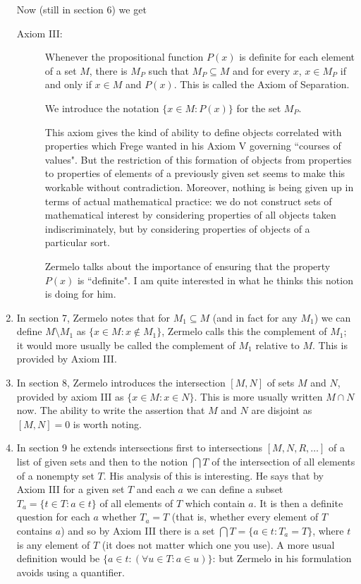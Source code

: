 \documentclass[12pt]{article}
\begin{document}
\begin{enumerate}
Now (still in section 6) we get

\begin{description}

\item[Axiom III:]  Whenever the propositional function $P(x)$ is definite for each element of a set $M$, there is $M_P$ such that $M_P \subseteq M$ and for every $x$,
$x \in M_P$ if and only if $x \in M$ and $P(x)$.  This is called the Axiom of Separation.

We introduce the notation $\{x \in M:P(x)\}$ for the set $M_P$.

This axiom gives the kind of ability to define objects correlated with properties which Frege wanted in his Axiom V governing ``courses of values".  But the restriction of
this formation of objects from properties to properties of elements of a previously given set seems to make this workable without contradiction.  Moreover, nothing is being given up
in terms of actual mathematical practice:  we do not construct sets of mathematical interest by considering properties of all objects taken indiscriminately, but by considering properties of objects of a particular sort.

Zermelo talks about the importance of ensuring that the property $P(x)$ is ``definite".  I am quite interested in what he thinks this notion is doing for him.

\end{description}

\item  In section 7, Zermelo notes that for $M_1 \subseteq M$ (and in fact for any $M_1$) we can define $M \setminus M_1$ as $\{x \in M: x \not\in M_1\}$,  Zermelo calls this the complement of $M_1$;  it would more usually be called the complement of $M_1$ relative to $M$.  This is provided by Axiom III.

\item In section 8, Zermelo introduces the intersection $[M,N]$ of sets $M$ and $N$, provided by axiom III as $\{x \in M:x \in N\}$.  This is more usually written $M \cap N$ now.  The ability to write the assertion that $M$ and $N$ are disjoint as $[M,N]=0$ is worth noting.

\item In section 9 he extends intersections first to intersections $[M,N,R, \ldots]$ of a list of given sets and then to the notion $\bigcap T$ of the intersection of all elements of
a nonempty set $T$.  His analysis of this is interesting.  He says that by Axiom III for a given set $T$ and each $a$ we can define a subset $T_a = \{t \in T:a \in t\}$ of all elements of $T$
which contain $a$.  It is then a definite question for each $a$ whether $T_a=T$ (that is, whether every element of $T$ contains $a$) and so by Axiom III there is a
set $\bigcap T = \{a \in t:T_a=T\}$, where $t$ is any element of $T$ (it does not matter which one you use).  A more usual definition would be $\{a \in t:(\forall u \in T:a \in u)\}$:  but Zermelo in his formulation avoids using a quantifier.


\end{enumerate}
\end{document}
